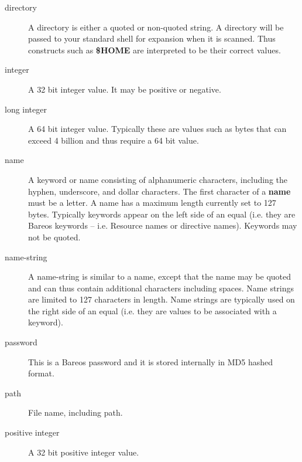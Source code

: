 \begin{description}

\item [directory]
    \label{DataTypeDirectory}
   A directory is either a quoted or  non-quoted string. A directory will be
passed to your  standard shell for expansion when it is scanned. Thus
constructs such as {\bf \$HOME} are interpreted to be  their correct values.


\item [integer]
    \label{DataTypeInteger}
   A 32 bit integer value. It may be positive or negative.


\item [long integer]
    \label{DataTypeLongInteger}
   A 64 bit integer value. Typically these  are values such as bytes that can
exceed 4 billion and thus  require a 64 bit value.


\item [name]
    \label{DataTypeName}
   A keyword or name consisting of alphanumeric characters, including the
hyphen, underscore, and dollar  characters. The first character of a {\bf
name} must be  a letter.  A name has a maximum length currently set to 127
bytes.  Typically keywords appear on the left side of an equal (i.e.  they are
Bareos keywords -- i.e. Resource names or  directive names). Keywords may not
be quoted.

\item [name-string]
    \label{DataTypeNameString}
   A name-string is similar to a name,  except that the name may be quoted and
can thus contain  additional characters including spaces. Name strings  are
limited to 127 characters in length. Name strings  are typically used on the
right side of an equal (i.e.  they are values to be associated with a keyword).


\item [password]
    \label{DataTypePassword}
   This is a Bareos password and it is stored internally in MD5 hashed format.


\item [path]
    \label{DataTypePath}
    File name, including path.


\item [positive integer]
    \label{DataTypePositiveInteger}
   A 32 bit positive integer value.



\end{description}
